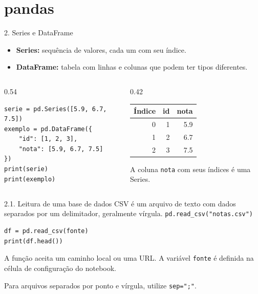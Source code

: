 \section{pandas}

\begin{frame}[fragile,t,label=cd-pandas]{2. Series e DataFrame}
\begin{itemize}
  \item \textbf{Series:} sequência de valores, cada um com seu índice.
  \item \textbf{DataFrame:} tabela com linhas e colunas que podem ter tipos diferentes.
\end{itemize}
\begin{columns}[T,onlytextwidth]
\begin{column}{0.54\textwidth}
\begin{lstlisting}
serie = pd.Series([5.9, 6.7, 7.5])
exemplo = pd.DataFrame({
    "id": [1, 2, 3],
    "nota": [5.9, 6.7, 7.5]
})
print(serie)
print(exemplo)
\end{lstlisting}
\end{column}
\begin{column}{0.42\textwidth}
\begin{tabular}{rrr}
\toprule
\textbf{Índice} & \textbf{id} & \textbf{nota} \\
\midrule
0 & 1 & 5.9 \\
1 & 2 & 6.7 \\
2 & 3 & 7.5 \\
\bottomrule
\end{tabular}
\smallskip

A coluna \texttt{nota} com seus índices é uma Series.
\end{column}
\end{columns}
\end{frame}

\begin{frame}[fragile,t]{2.1. Leitura de uma base de dados}
CSV é um arquivo de texto com dados separados por um delimitador, geralmente vírgula.
\texttt{pd.read\_csv("notas.csv")}
\begin{lstlisting}
df = pd.read_csv(fonte)
print(df.head())
\end{lstlisting}
\begin{EMASCnote}
A função aceita um caminho local ou uma URL. A variável \texttt{fonte} é definida na célula de configuração do notebook.
\end{EMASCnote}
\medskip
Para arquivos separados por ponto e vírgula, utilize \texttt{sep=";"}.
\end{frame}

